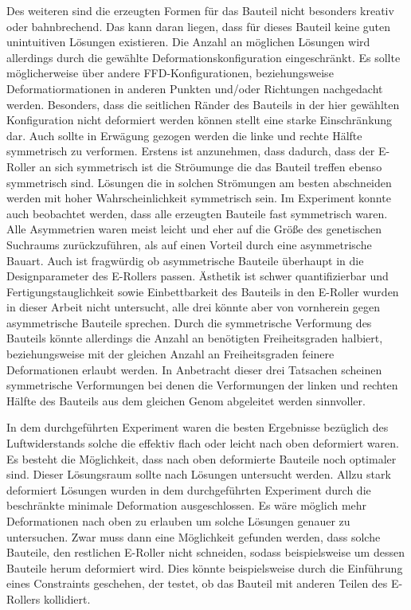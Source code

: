 Des weiteren sind die erzeugten Formen für das Bauteil nicht besonders kreativ oder bahnbrechend.
Das kann daran liegen, dass für dieses Bauteil keine guten unintuitiven Lösungen existieren.
Die Anzahl an möglichen Lösungen wird allerdings durch die gewählte Deformationskonfiguration eingeschränkt.
Es sollte möglicherweise über andere FFD-Konfigurationen, beziehungsweise Deformatiormationen in anderen Punkten und/oder Richtungen nachgedacht werden.
Besonders, dass die seitlichen Ränder des Bauteils in der hier gewählten Konfiguration nicht deformiert werden können stellt eine starke Einschränkung dar.
Auch sollte in Erwägung gezogen werden die linke und rechte Hälfte symmetrisch zu verformen.
Erstens ist anzunehmen, dass dadurch, dass der E-Roller an sich symmetrisch ist die Ströumunge die das Bauteil treffen ebenso symmetrisch sind.
Lösungen die in solchen Strömungen am besten abschneiden werden mit hoher Wahrscheinlichkeit symmetrisch sein.
Im Experiment konnte auch beobachtet werden, dass alle erzeugten Bauteile fast symmetrisch waren.
Alle Asymmetrien waren meist leicht und eher auf die Größe des genetischen Suchraums zurückzuführen, als auf einen Vorteil durch eine asymmetrische Bauart.
Auch ist fragwürdig ob  asymmetrische Bauteile überhaupt in die Designparameter des E-Rollers passen.
Ästhetik ist schwer quantifizierbar und Fertigungstauglichkeit sowie Einbettbarkeit des Bauteils in den E-Roller wurden in dieser Arbeit nicht untersucht, alle drei könnte aber von vornherein gegen asymmetrische Bauteile sprechen.
Durch die symmetrische Verformung des Bauteils könnte allerdings die Anzahl an benötigten Freiheitsgraden halbiert, beziehungsweise mit der gleichen Anzahl an Freiheitsgraden feinere Deformationen erlaubt werden.
In Anbetracht dieser drei Tatsachen scheinen symmetrische Verformungen bei denen die Verformungen der linken und rechten Hälfte des Bauteils aus dem gleichen Genom abgeleitet werden sinnvoller.

In dem durchgeführten Experiment waren die besten Ergebnisse bezüglich des Luftwiderstands solche die effektiv flach oder leicht nach oben deformiert waren.
Es besteht die Möglichkeit, dass nach oben deformierte Bauteile noch optimaler sind.
Dieser Lösungsraum sollte nach Lösungen untersucht werden.
Allzu stark deformiert Lösungen wurden in  dem durchgeführten Experiment durch die beschränkte minimale Deformation ausgeschlossen.
Es wäre möglich mehr Deformationen nach oben zu erlauben um solche Lösungen genauer zu untersuchen.
Zwar muss dann eine Möglichkeit gefunden werden, dass solche Bauteile, den restlichen E-Roller nicht schneiden, sodass beispielsweise um dessen Bauteile herum deformiert wird.
Dies könnte beispielsweise durch die Einführung eines Constraints geschehen, der testet, ob das Bauteil mit anderen Teilen des E-Rollers kollidiert.


